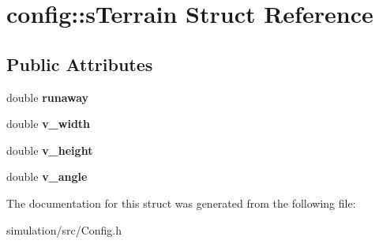 \hypertarget{structconfig_1_1s_terrain}{}\section{config\+:\+:s\+Terrain Struct Reference}
\label{structconfig_1_1s_terrain}
\subsection*{Public Attributes}
\begin{DoxyCompactItemize}
\item 
\mbox{\label{structconfig_1_1s_terrain_ad6c30d8e675a81113ff3e5af46e636ac}} 
double {\bfseries runaway}
\item 
\mbox{\label{structconfig_1_1s_terrain_a6a8545cc6a2c5a232f5e60971a92cbb0}} 
double {\bfseries v\+\_\+width}
\item 
\mbox{\label{structconfig_1_1s_terrain_aee6358b6e85e5599aa76af2e0f765ca0}} 
double {\bfseries v\+\_\+height}
\item 
\mbox{\label{structconfig_1_1s_terrain_a8e98646a0b5acab7df066a6859459b2e}} 
double {\bfseries v\+\_\+angle}
\end{DoxyCompactItemize}


The documentation for this struct was generated from the following file\+:\begin{DoxyCompactItemize}
\item 
simulation/src/Config.\+h\end{DoxyCompactItemize}
